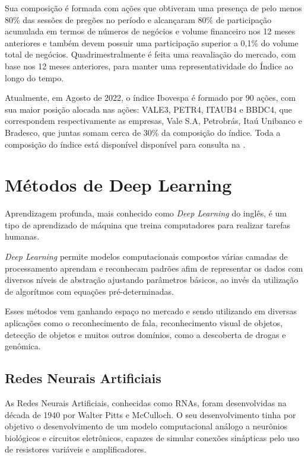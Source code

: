 Sua composição é formada com
ações que obtiveram uma presença de pelo menos 80\% das sessões de pregões no
período e alcançaram 80\% de participação acumulada em termos de números de
negócios e volume financeiro nos 12 meses anteriores e também devem possuir
uma participação superior a 0,1\% do volume total de negócios. Quadrimestralmente
é feita uma reavaliação do mercado, com base nos 12 meses anteriores, para manter
uma representatividade do Índice ao longo do tempo.\cite{indice}

Atualmente, em Agosto de 2022, o índice Ibovespa é formado por 90 ações, com sua maior posição alocada nas ações: VALE3, PETR4, ITAUB4 e BBDC4, que correspondem respectivamente as empresas, Vale S.A, Petrobrás, Itaú Unibanco e Bradesco, que juntas somam cerca de 30\% da composição do índice. Toda a composição do índice está disponível disponível para consulta na \cite{b3}.

\section{Métodos de Deep Learning}
\label{mdl}

Aprendizagem profunda, mais conhecido como \emph{Deep Learning} do inglês, é um tipo de aprendizado de máquina que treina computadores para realizar tarefas humanas\cite{sas}. 

\textit{Deep Learning} permite modelos computacionais compostos várias camadas de processamento aprendam e reconhecam padrões afim de representar os dados com diversos níveis de abstração ajustando parâmetros básicos, ao invés da utilização de algorítmos com equações pré-determinadas.

Esses métodos vem ganhando espaço no mercado e sendo utilizando em diversas aplicações como o reconhecimento de fala, reconhecimento visual de objetos, detecção de objetos e muitos outros domínios, como a descoberta de drogas e genômica. \cite{dp}

\subsection{Redes Neurais Artificiais}

As Redes Neurais Artificiais, conhecidas como RNAs, foram desenvolvidas na década de 1940 por Walter Pitts e McCulloch. O seu desenvolvimento tinha por objetivo o desenvolvimento de um modelo computacional análogo a neurônios biológicos e circuitos eletrônicos, capazes de simular conexões sinápticas pelo uso de resistores variáveis e amplificadores.\cite{rna}

